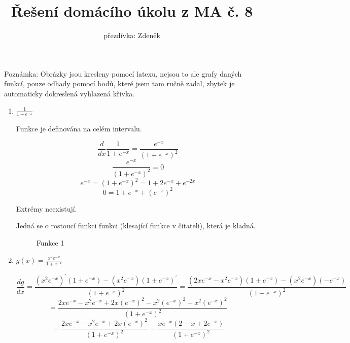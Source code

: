 \documentclass[10pt,a4paper]{article}
\title{Řešení domácího úkolu z MA č. 8}
\author{přezdívka: Zdeněk}
\date{}
\theoremstyle{plain}
\theoremstyle{definition}
\begin{document}
\maketitle

\section{}

Poznámka: Obrázky jsou kresleny pomocí latexu, nejsou to ale grafy daných funkcí, pouze odhady pomocí bodů, které jsem tam ručně zadal, zbytek je automaticky dokreslená vyhlazená křivka.

\begin{enumerate}[label=(\alph*)	]
\item $\frac1{1+e^{-x}}$

Funkce je definována na celém intervalu. 

\[ \frac{d}{dx} \frac1{1+e^{-x}} = \frac{e^{-x}}{(1+e^{-x})^2}  \]
\[ \frac{e^{-x}}{(1+e^{-x})^2} = 0 \]
\[ e^{-x} = (1+e^{-x})^2 =  1 + 2e^{-x} + e^{-2x} \]
\[ 0 =  1 + e^{-x} + (e^{-x})^2 \]

Extrémy neexistují.

Jedná se o rostoucí funkci funkci (klesající funkce v čitateli), která je kladná.

\begin{figure}[h!]
  \begin{center}
    \caption{Funkce 1}
  \end{center}
\end{figure}

\item $g(x) = \frac{x^2e^{-x}}{1+e^{-x}}$

\[ \frac{dg}{dx} 
= \frac{(x^2e^{-x})^\prime(1+e^{-x}) - (x^2e^{-x})(1+e^{-x})^\prime }{(1+e^{-x})^2} 
=  \frac{(2xe^{-x} - x^2e^{-x})(1+e^{-x}) - (x^2e^{-x})(-e^{-x}) }{(1+e^{-x})^2}  \]\[
= \frac{2xe^{-x} - x^2e^{-x} + 2x(e^{-x})^2 - x^2(e^{-x})^2 + x^2(e^{-x})^2 }{(1+e^{-x})^2} 
\]\[
= \frac{2xe^{-x} - x^2e^{-x} + 2x(e^{-x})^2}{(1+e^{-x})^2} 
= \frac{xe^{-x}(2 - x + 2e^{-x})}{(1+e^{-x})^2} 
\]


\end{enumerate}
\end{document}
